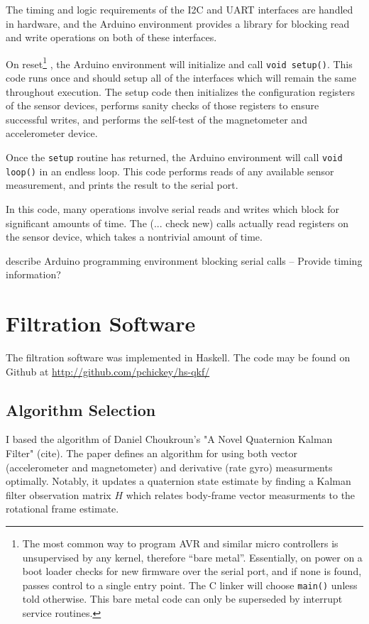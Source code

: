 \documentclass[12pt]{report}
\begin{document}
The timing and logic requirements of the I2C and UART interfaces are handled in hardware, and the Arduino environment provides a library for blocking read and write operations on both of these interfaces. 

On reset\footnote{The most common way to program AVR and similar micro controllers is unsupervised by any kernel, therefore ``bare metal''. Essentially, on power on a boot loader checks for new firmware over the serial port, and if none is found, passes control to a single entry point. The C linker will choose \lstinline$main()$ unless told otherwise. This bare metal code can only be superseded by interrupt service routines.}
, the Arduino environment will initialize and call \lstinline$void setup()$. This code runs once and should setup all of the interfaces which will remain the same throughout execution. The setup code then initializes the configuration registers of the sensor devices, performs sanity checks of those registers to ensure successful writes, and performs the self-test of the magnetometer and accelerometer device. 


Once the \lstinline$setup$ routine has returned, the Arduino environment will call \lstinline$void loop()$ in an endless loop. This code performs reads of any available sensor measurement, and prints the result to the serial port.


In this code, many operations involve serial reads and writes which block for significant amounts of time. The (... check new) calls actually read registers on the sensor device, which takes a nontrivial amount of time. 



describe Arduino programming environment
blocking serial calls
-- Provide timing information?

\section{Filtration Software}
The filtration software was implemented in Haskell. The code may be found on Github at \url{http://github.com/pchickey/hs-qkf/}
\lstset{language=Haskell}
\subsection{Algorithm Selection}
I based the algorithm of Daniel Choukroun's "A Novel Quaternion Kalman Filter" (cite). The paper defines an algorithm for using both vector (accelerometer and magnetometer) and derivative (rate gyro) measurments optimally. Notably, it updates a quaternion state estimate by finding a Kalman filter observation matrix $H$ which relates body-frame vector measurments to the rotational frame estimate.
\end{document}
